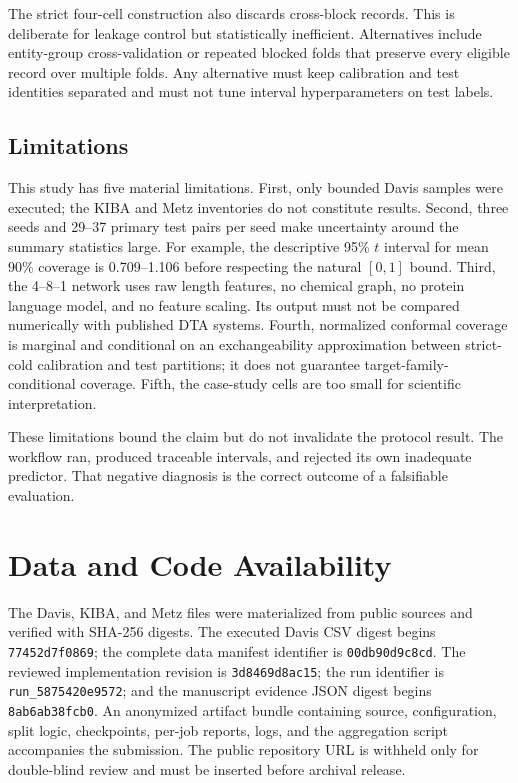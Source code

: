 \documentclass[lettersize,journal]{IEEEtran}
\begin{document}
The strict four-cell construction also discards cross-block records. This is deliberate for leakage control but statistically inefficient. Alternatives include entity-group cross-validation or repeated blocked folds that preserve every eligible record over multiple folds. Any alternative must keep calibration and test identities separated and must not tune interval hyperparameters on test labels.

\subsection{Limitations}
This study has five material limitations. First, only bounded Davis samples were executed; the KIBA and Metz inventories do not constitute results. Second, three seeds and 29--37 primary test pairs per seed make uncertainty around the summary statistics large. For example, the descriptive 95\% $t$ interval for mean 90\% coverage is 0.709--1.106 before respecting the natural $[0,1]$ bound. Third, the 4--8--1 network uses raw length features, no chemical graph, no protein language model, and no feature scaling. Its output must not be compared numerically with published DTA systems. Fourth, normalized conformal coverage is marginal and conditional on an exchangeability approximation between strict-cold calibration and test partitions; it does not guarantee target-family-conditional coverage. Fifth, the case-study cells are too small for scientific interpretation.

These limitations bound the claim but do not invalidate the protocol result. The workflow ran, produced traceable intervals, and rejected its own inadequate predictor. That negative diagnosis is the correct outcome of a falsifiable evaluation.

\balance
\section{Data and Code Availability}
The Davis, KIBA, and Metz files were materialized from public sources and verified with SHA-256 digests. The executed Davis CSV digest begins \texttt{77452d7f0869}; the complete data manifest identifier is \texttt{00db90d9c8cd}. The reviewed implementation revision is \texttt{3d8469d8ac15}; the run identifier is \texttt{run\_5875420e9572}; and the manuscript evidence JSON digest begins \texttt{8ab6ab38fcb0}. An anonymized artifact bundle containing source, configuration, split logic, checkpoints, per-job reports, logs, and the aggregation script accompanies the submission. The public repository URL is withheld only for double-blind review and must be inserted before archival release.
\end{document}
